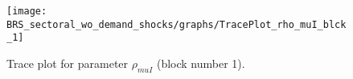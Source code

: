 \begin{figure}[H]
\centering
  \texttt{[image: BRS\_sectoral\_wo\_demand\_shocks/graphs/TracePlot\_rho\_muI\_blck\_1]}\\
    \caption{Trace plot for parameter ${\rho_{muI}}$ (block number 1).}
\end{figure}
